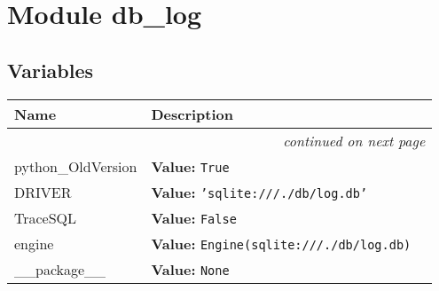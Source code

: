 %
%
%


\section{Module db\_log}

    \label{db_log}


  \subsection{Variables}

    \vspace{-1cm}
\hspace{\varindent}\begin{longtable}{|p{\varnamewidth}|p{\vardescrwidth}|l}
\cline{1-2}
\cline{1-2} \centering \textbf{Name} & \centering \textbf{Description}& \\
\cline{1-2}
\endhead\cline{1-2}\multicolumn{3}{r}{\small\textit{continued on next page}}\\\endfoot\cline{1-2}
\endlastfoot\raggedright p\-y\-t\-h\-o\-n\-\_\-O\-l\-d\-V\-e\-r\-s\-i\-o\-n\- & \raggedright \textbf{Value:} 
{\tt True}&\\
\cline{1-2}
\raggedright D\-R\-I\-V\-E\-R\- & \raggedright \textbf{Value:} 
{\tt \texttt{'}\texttt{sqlite:///./db/log.db}\texttt{'}}&\\
\cline{1-2}
\raggedright T\-r\-a\-c\-e\-S\-Q\-L\- & \raggedright \textbf{Value:} 
{\tt False}&\\
\cline{1-2}
\raggedright e\-n\-g\-i\-n\-e\- & \raggedright \textbf{Value:} 
{\tt Engine(sqlite:///./db/log.db)}&\\
\cline{1-2}
\raggedright \_\-\_\-p\-a\-c\-k\-a\-g\-e\-\_\-\_\- & \raggedright \textbf{Value:} 
{\tt None}&\\
\cline{1-2}
\end{longtable}


